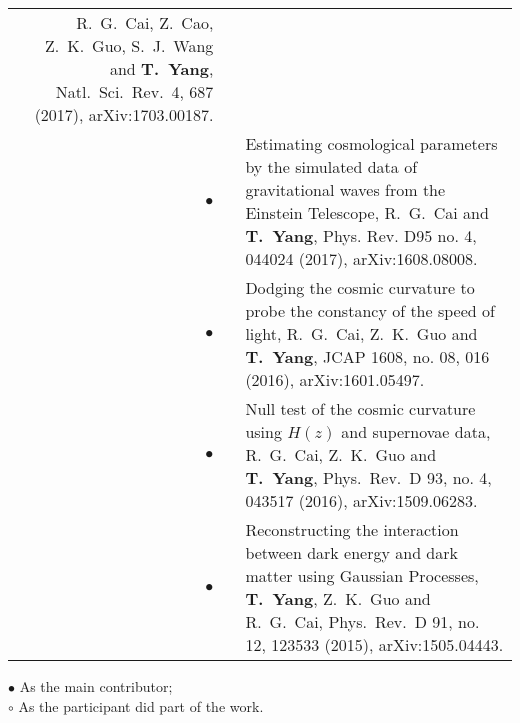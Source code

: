 \documentclass[letterpaper]{moderncv}
\begin{document}
{\begin{longtable}{rp{0.3cm}p{15.55cm}}
  R.~G.~Cai, Z.~Cao, Z.~K.~Guo, S.~J.~Wang and \textbf{T.~Yang},
  Natl.\ Sci.\ Rev.\  {4}, 687 (2017),
  arXiv:1703.00187.
\vspace{0.05cm}\\
\textbf{$\bullet$} & & Estimating cosmological parameters by the simulated data of gravitational waves from the Einstein Telescope,
  R.~G.~Cai and \textbf{T.~Yang},
  Phys. Rev. D95 no. 4, 044024 (2017),
  arXiv:1608.08008.
\vspace{0.05cm}\\
\textbf{$\bullet$} & &  Dodging the cosmic curvature to probe the constancy of the speed of light,
  R.~G.~Cai, Z.~K.~Guo and \textbf{T.~Yang},
  JCAP {1608}, no. 08, 016 (2016),
  arXiv:1601.05497.
\vspace{0.05cm}\\
\textbf{$\bullet$} & & Null test of the cosmic curvature using $H(z)$ and supernovae data,
  R.~G.~Cai, Z.~K.~Guo and \textbf{T.~Yang},
  Phys.\ Rev.\ D {93}, no. 4, 043517 (2016),
  arXiv:1509.06283.
\vspace{0.05cm}\\
\textbf{$\bullet$} & & Reconstructing the interaction between dark energy and dark matter using Gaussian Processes,
  \textbf{T.~Yang}, Z.~K.~Guo and R.~G.~Cai,
  Phys.\ Rev.\ D {91}, no. 12, 123533 (2015),
  arXiv:1505.04443.
\vspace{0.05cm}\\
\end{longtable}
}

\textbf{$\bullet$} As the main contributor;\\
\textbf{$\circ$} As the participant did part of the work.



\end{document}
